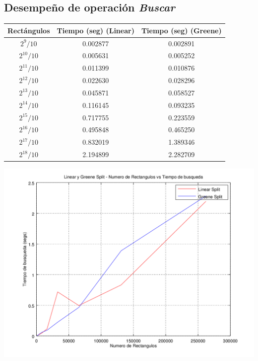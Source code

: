 \documentclass[letterpaper,10pt]{article}
\begin{document}
	\newpage

	\subsection{Desempeño de operación \textit{Buscar}}

	\begin{center}

		\begin{tabular}{|c|c||c|}
			\hline
			Rectángulos	& Tiempo (seg) (Linear) & Tiempo (seg) (Greene) \\
			\hline
			$2^{9}/10$ 	& 0.002877	& 0.002891\\
			\hline
			$2^{10}/10$ 	& 0.005631	& 0.005252\\
			\hline
			$2^{11}/10$ 	& 0.011399	& 0.010876\\
			\hline
			$2^{12}/10$ 	& 0.022630	& 0.028296\\
			\hline
			$2^{13}/10$ 	& 0.045871	& 0.058527\\
			\hline
			$2^{14}/10$ 	& 0.116145	& 0.093235\\
			\hline
			$2^{15}/10$ 	& 0.717755	& 0.223559\\
			\hline
			$2^{16}/10$ 	& 0.495848	& 0.465250\\
			\hline
			$2^{17}/10$ 	& 0.832019	& 1.389346\\
			\hline
			$2^{18}/10$ 	& 2.194899	& 2.282709\\
			\hline
		\end{tabular}

		\includegraphics[width=0.75\textheight]{fig3.png}
	\end{center}
\end{document}
